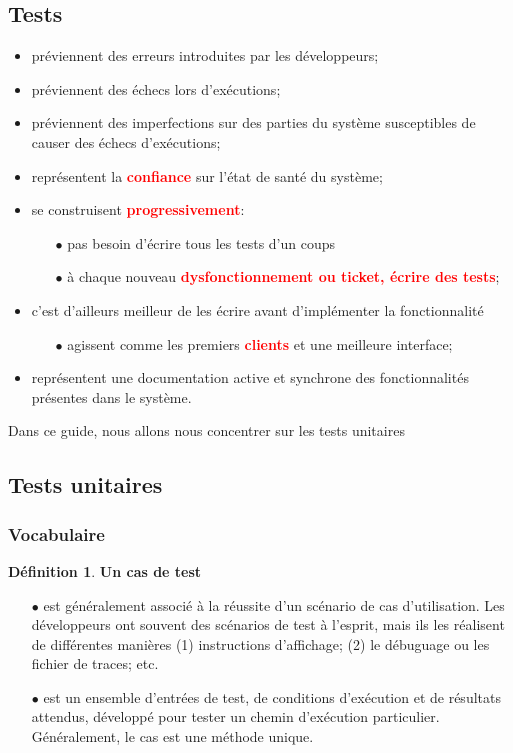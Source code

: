 \documentclass[a4paper,11pt,french]{refart}
\theoremstyle{definition}
\newtheorem{definition}{Définition}[section]
\begin{document}
\subsection{Tests}
\begin{itemize}
    \item préviennent des erreurs introduites par les développeurs;
    \item préviennent des échecs lors d'exécutions;
    \item préviennent des imperfections sur des parties du système susceptibles de causer des échecs d'exécutions;
    \item représentent la \textbf{\textcolor{red}{confiance}} sur l'état de santé du système;
    \item se construisent \textbf{\textcolor{red}{progressivement}}:
    \begin{itemize}
        \item[$\bullet$] pas besoin d'écrire tous les tests d'un coups
        \item[$\bullet$] à chaque nouveau  \textbf{\textcolor{red}{dysfonctionnement ou ticket, écrire des tests}};
    \end{itemize}
    \item c'est d'ailleurs meilleur de les écrire avant d'implémenter la fonctionnalité 
    \begin{itemize}
        \item[$\bullet$] agissent comme les premiers \textbf{\textcolor{red}{clients}} et une meilleure interface; 
    \end{itemize}
    \item représentent une documentation active et synchrone des fonctionnalités présentes dans le système.
    
\end{itemize}
Dans ce guide, nous allons nous concentrer sur les tests unitaires
\subsection{Tests unitaires}
\subsubsection{Vocabulaire}
\theoremstyle{definition}
\begin{definition}{ \textbf{Un cas de test}}
\begin{itemize}
  \item [$\bullet$] est généralement associé à la réussite d'un scénario de cas d'utilisation. Les développeurs ont souvent des scénarios de test à l'esprit, mais ils les réalisent de différentes manières (1) instructions d'affichage; (2) le débuguage ou les fichier de traces; etc.

 \item [$\bullet$] est un ensemble d'entrées de test, de conditions d'exécution et de résultats attendus, développé pour tester un chemin d'exécution particulier. Généralement, le cas est une méthode unique.
 \end{itemize}
 \end{definition}
\end{document}
